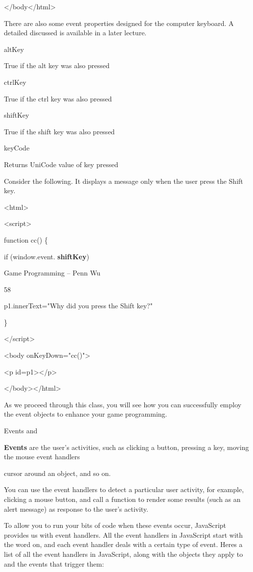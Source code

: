 \documentclass[
]{article}
\begin{document}
\textless/body\textless/html\textgreater{}

There are also some event properties designed for the computer keyboard.
A detailed discussed is available in a later lecture.

altKey

True if the alt key was also pressed

ctrlKey

True if the ctrl key was also pressed

shiftKey

True if the shift key was also pressed

keyCode

Returns UniCode value of key pressed

Consider the following. It displays a message only when the user press
the Shift key.

\textless html\textgreater{}

\textless script\textgreater{}

function cc() \{

if (window.event. \textbf{shiftKey})

Game Programming -- Penn Wu

58

\protect\hypertarget{index_split_005.htmlux5cux23p59}{}{}
p1.innerText="Why did you press the Shift key?"

\}

\textless/script\textgreater{}

\textless body onKeyDown="cc()"\textgreater{}

\textless p id=p1\textgreater\textless/p\textgreater{}

\textless/body\textgreater\textless/html\textgreater{}

As we proceed through this class, you will see how you can successfully
employ the event objects to enhance your game programming.

Events and

\textbf{Events} are the user's activities, such as clicking a button,
pressing a key, moving the mouse event handlers

cursor around an object, and so on.

You can use the event handlers to detect a particular user activity, for
example, clicking a mouse button, and call a function to render some
results (such as an alert message) as response to the user's activity.

To allow you to run your bits of code when these events occur,
JavaScript provides us with event handlers. All the event handlers in
JavaScript start with the word on, and each event handler deals with a
certain type of event. Here\textquotesingle s a list of all the event
handlers in JavaScript, along with the objects they apply to and the
events that trigger them:
\end{document}
